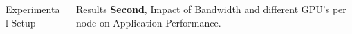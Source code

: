 \documentclass[final]{beamer}
\newlength{\onecolwid}
\newlength{\twocolwid}
\begin{document}
\begin{frame}[t]
\begin{columns}[t]
\begin{column}{\twocolwid}
\begin{columns}[t,totalwidth=\twocolwid]
\begin{column}{\onecolwid}
\begin{block}{Experimental Setup}

\end{block}


\end{column} %

\begin{column}{\onecolwid}\vspace{-.6in} %

\vspace{-1em}
\begin{block}{Results}
\newline
\textbf{Second}, Impact of Bandwidth and different GPU's per node on Application Performance.


\end{block}
\end{column}
\end{columns}
\end{column}
\end{columns}
\end{frame}
\end{document}
